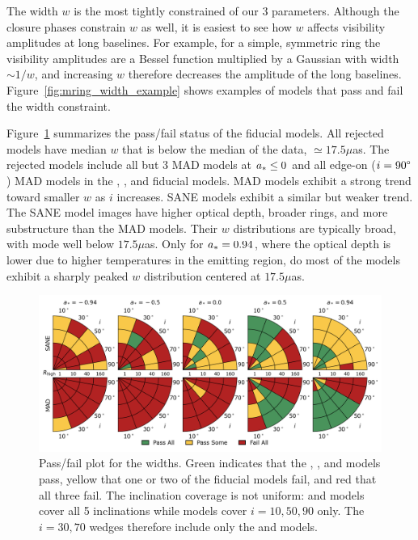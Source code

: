 The \mring width $w$ is the most tightly constrained of our 3 parameters.
Although the closure phases constrain $w$ as well, it is easiest to see how $w$ affects visibility amplitudes at long baselines.
For example, for a simple, symmetric ring the visibility amplitudes are a Bessel function multiplied by a Gaussian with width $\sim 1/w$, and increasing $w$ therefore decreases the amplitude of the long baselines.
Figure~\ref{fig:mring_width_example} shows examples of models that pass and fail the \mring width constraint.

Figure~\ref{fig:mring_width_salsa} summarizes the \mring  pass/fail status of the fiducial models.
All rejected models have median $w$ that is below the median of the data, $ \simeq 17.5\mu$as.
The rejected models include all but 3 MAD models at $a_* \le 0$ and all edge-on ($i = 90\degree$) MAD models in the  \kharma, \bhac, and \hamr fiducial models.
MAD models exhibit a strong trend toward smaller $w$ as $i$ increases.
SANE models exhibit a similar but weaker trend.
The SANE model images have  higher optical depth, broader rings, and more substructure than the MAD models.
Their $w$ distributions are typically broad, with mode well below $17.5\mu$as.
Only for $a_* = 0.94$, where the optical depth is lower due to higher temperatures in the emitting region, do most of the models exhibit a sharply peaked $w$ distribution centered at $17.5\mu$as.

\begin{figure}\label{fig:mring_width_salsa}
 \centering
 \includegraphics[width=\textwidth]{./figures/Mring_w_Constraints.png}
  \caption{Pass/fail plot for the \mring widths.
    Green indicates that the \kharma, \bhac, and \hamr models pass, yellow that one or two of the fiducial models fail, and red that all three fail.
    The inclination coverage is not uniform: \bhac and \kharma models cover all 5 inclinations while \hamr models cover $i = 10, 50, 90$ only.
    The $i = 30, 70$ wedges therefore include only the \bhac and \kharma models.}
\end{figure}

